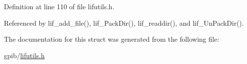 Definition at line 110 of file lifutils.\+h.



Referenced by lif\+\_\+add\+\_\+file(), lif\+\_\+\+Pack\+Dir(), lif\+\_\+readdir(), and lif\+\_\+\+Un\+Pack\+Dir().



The documentation for this struct was generated from the following file\+:\begin{DoxyCompactItemize}
\item 
gpib/\hyperlink{lifutils_8h}{lifutils.\+h}\end{DoxyCompactItemize}

